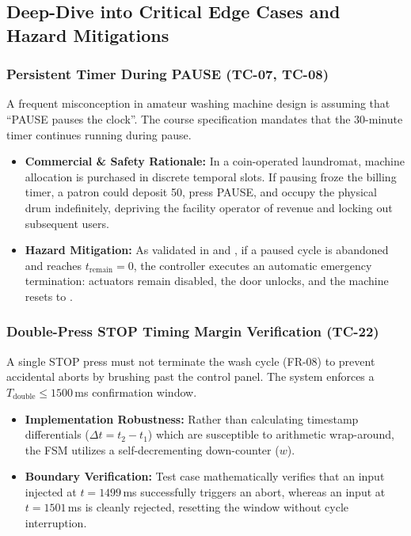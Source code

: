 \subsection{Deep-Dive into Critical Edge Cases and Hazard Mitigations}

\subsubsection{Persistent Timer During PAUSE (TC-07, TC-08)}
A frequent misconception in amateur washing machine design is assuming that ``PAUSE pauses the clock''. The course specification mandates that the 30-minute timer continues running during pause. 
\begin{itemize}
  \item \textbf{Commercial \& Safety Rationale:} In a coin-operated laundromat, machine allocation is purchased in discrete temporal slots. If pausing froze the billing timer, a patron could deposit 50\cent, press PAUSE, and occupy the physical drum indefinitely, depriving the facility operator of revenue and locking out subsequent users.
  \item \textbf{Hazard Mitigation:} As validated in  and , if a paused cycle is abandoned and reaches $t_{\text{remain}} = 0$, the controller executes an automatic emergency termination: actuators remain disabled, the door unlocks, and the machine resets to .
\end{itemize}

\subsubsection{Double-Press STOP Timing Margin Verification (TC-22)}
A single STOP press must not terminate the wash cycle (FR-08) to prevent accidental aborts by brushing past the control panel. The system enforces a $T_{\text{double}} \le 1500$\,ms confirmation window.
\begin{itemize}
  \item \textbf{Implementation Robustness:} Rather than calculating timestamp differentials ($\Delta t = t_2 - t_1$) which are susceptible to arithmetic wrap-around, the FSM utilizes a self-decrementing down-counter ($w$). 
  \item \textbf{Boundary Verification:} Test case  mathematically verifies that an input injected at $t = 1499$\,ms successfully triggers an abort, whereas an input at $t = 1501$\,ms is cleanly rejected, resetting the window without cycle interruption.
\end{itemize}

